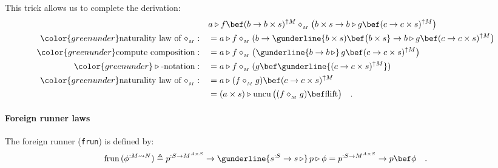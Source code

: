 This trick allows us to complete the derivation:
\begin{align*}
 & a\triangleright f\bef(b\rightarrow b\times s)^{\uparrow M}\diamond_{_{M}}\big(b\times s\rightarrow b\triangleright g\bef(c\rightarrow c\times s)^{\uparrow M}\big)\\
{\color{greenunder}\text{naturality law of }\diamond_{_{M}}:}\quad & =a\triangleright f\diamond_{_{M}}(b\rightarrow\gunderline{b\times s)\bef\big(b\times s}\rightarrow b\triangleright g\bef(c\rightarrow c\times s)^{\uparrow M}\big)\\
{\color{greenunder}\text{compute composition}:}\quad & =a\triangleright f\diamond_{_{M}}\big(\gunderline{b\rightarrow b\,\triangleright}\,g\bef(c\rightarrow c\times s)^{\uparrow M}\big)\\
{\color{greenunder}\triangleright\text{-notation}:}\quad & =a\triangleright f\diamond_{_{M}}(g\bef\gunderline{(c\rightarrow c\times s)^{\uparrow M}})\\
{\color{greenunder}\text{naturality law of }\diamond_{_{M}}:}\quad & =a\triangleright(f\diamond_{_{M}}g)\bef(c\rightarrow c\times s)^{\uparrow M}\\
 & =\left(a\times s\right)\triangleright\text{uncu}\,\big((f\diamond_{_{M}}g)\bef\text{flift}\big)\quad.
\end{align*}
 

\paragraph{Foreign runner laws}

The foreign runner (\lstinline!frun!) is defined by:
\[
\text{frun}\,(\phi^{:M\leadsto N})\triangleq p^{:S\rightarrow M^{A\times S}}\rightarrow\gunderline{s^{:S}\rightarrow s\,\triangleright}\,p\triangleright\phi=p^{:S\rightarrow M^{A\times S}}\rightarrow p\bef\phi\quad.
\]

